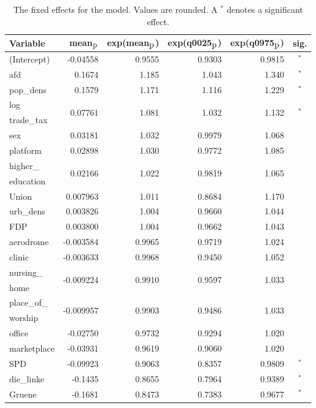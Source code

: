 \begin{table}[H]
\caption{The fixed effects for the model. Values are rounded. A $^*$ denotes a significant effect. \label{FixedAllGermany_nospatial}}
\begin{tabular}{l r r r r c}
\toprule
\textbf{Variable}	& \textbf{mean$_{\hbox{p}}$}	& \textbf{exp(mean$_{\hbox{p}}$)} & \textbf{exp(q0025$_{\hbox{p}}$)} & \textbf{exp(q0975$_{\hbox{p}}$)} & \textbf{sig.}\\
\midrule
(Intercept) & -0.04558 & 0.9555 & 0.9303 & 0.9815 & $^*$\\
afd & 0.1674 & 1.185 & 1.043 & 1.340 & $^*$\\
pop\_dens & 0.1579 & 1.171 & 1.116 & 1.229 & $^*$\\
log & \multirow{2}{*}{0.07761} & \multirow{2}{*}{1.081} & \multirow{2}{*}{1.032} & \multirow{2}{*}{1.132} & \multirow{2}{*}{$^*$}\\
trade\_tax \\
sex & 0.03181 & 1.032 & 0.9979 & 1.068 & \\
platform & 0.02898 & 1.030 & 0.9772 & 1.085 \\
higher\_ & \multirow{2}{*}{0.02166} & \multirow{2}{*}{1.022} & \multirow{2}{*}{0.9819} & \multirow{2}{*}{1.065} \\
education\\
Union & 0.007963 & 1.011 & 0.8684 & 1.170\\
urb\_dens & 0.003826 & 1.004 & 0.9660 & 1.044 \\
FDP & 0.003800 & 1.004 & 0.9662 & 1.043 \\
aerodrome & -0.003584 & 0.9965 & 0.9719 & 1.024 \\
clinic & -0.003633 & 0.9968 & 0.9450 & 1.052 \\
nursing\_ & \multirow{2}{*}{-0.009224} & \multirow{2}{*}{0.9910} & \multirow{2}{*}{0.9597} & \multirow{2}{*}{1.033} \\
home\\
place\_of\_ & \multirow{2}{*}{-0.009957} & \multirow{2}{*}{0.9903} & \multirow{2}{*}{0.9486} & \multirow{2}{*}{1.033} \\
worship\\
office & -0.02750 & 0.9732 & 0.9294 & 1.020 \\
marketplace & -0.03931 & 0.9619 & 0.9060 & 1.020 \\
SPD & -0.09923 & 0.9063 & 0.8357 & 0.9809 & $^*$\\
die\_linke & -0.1435 & 0.8655 & 0.7964 & 0.9389 & $^*$\\
Gruene & -0.1681 & 0.8473 & 0.7383 & 0.9677 & $^*$\\
\bottomrule
\end{tabular}
\end{table}
